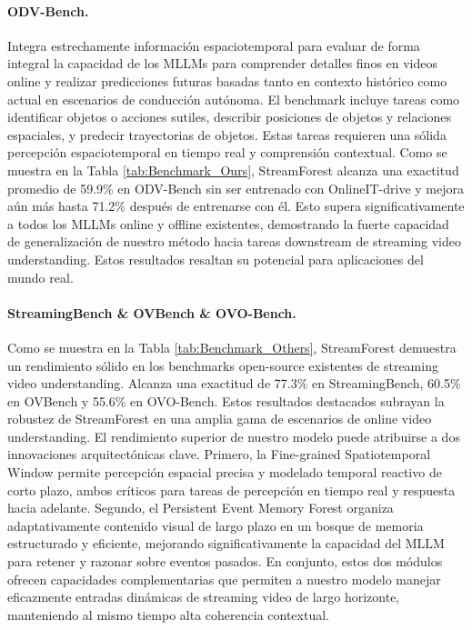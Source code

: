 \paragraph{ODV-Bench.} Integra estrechamente información espaciotemporal para evaluar de forma integral la capacidad de los MLLMs para comprender detalles finos en videos online y realizar predicciones futuras basadas tanto en contexto histórico como actual en escenarios de conducción autónoma. El benchmark incluye tareas como identificar objetos o acciones sutiles, describir posiciones de objetos y relaciones espaciales, y predecir trayectorias de objetos. Estas tareas requieren una sólida percepción espaciotemporal en tiempo real y comprensión contextual. Como se muestra en la Tabla \ref{tab:Benchmark_Ours}, StreamForest alcanza una exactitud promedio de 59.9\% en ODV-Bench sin ser entrenado con OnlineIT-drive y mejora aún más hasta 71.2\% después de entrenarse con él. Esto supera significativamente a todos los MLLMs online y offline existentes, demostrando la fuerte capacidad de generalización de nuestro método hacia tareas downstream de streaming video understanding. Estos resultados resaltan su potencial para aplicaciones del mundo real.






\paragraph{StreamingBench \& OVBench \& OVO-Bench.} Como se muestra en la Tabla \ref{tab:Benchmark_Others}, StreamForest demuestra un rendimiento sólido en los benchmarks open-source existentes de streaming video understanding. Alcanza una exactitud de 77.3\% en StreamingBench, 60.5\% en OVBench y 55.6\% en OVO-Bench. Estos resultados destacados subrayan la robustez de StreamForest en una amplia gama de escenarios de online video understanding. El rendimiento superior de nuestro modelo puede atribuirse a dos innovaciones arquitectónicas clave. Primero, la Fine-grained Spatiotemporal Window permite percepción espacial precisa y modelado temporal reactivo de corto plazo, ambos críticos para tareas de percepción en tiempo real y respuesta hacia adelante. Segundo, el Persistent Event Memory Forest organiza adaptativamente contenido visual de largo plazo en un bosque de memoria estructurado y eficiente, mejorando significativamente la capacidad del MLLM para retener y razonar sobre eventos pasados. En conjunto, estos dos módulos ofrecen capacidades complementarias que permiten a nuestro modelo manejar eficazmente entradas dinámicas de streaming video de largo horizonte, manteniendo al mismo tiempo alta coherencia contextual.



